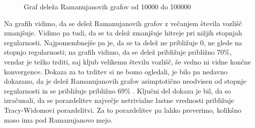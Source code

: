 \begin{figure}[H]
    \centering
    \caption{Graf deleža Ramanujanovih grafov od 10000 do 100000}
\end{figure}
Na grafih vidimo, da se delež Ramanujanovih grafov z večanjem števila vozlišč zmanjšuje. Vidimo pa tudi, da se ta delež zmanjšuje hitreje pri nižjih stopnjah regularnosti. Najpomembnejše pa je, da se ta delež ne približuje \(0\), ne glede na stopnjo regularnosti; na grafih vidimo, da se delež približuje približno \(70\%\), vendar je težko trditi, saj kljub velikemu številu vozlišč, še vedno ni vidne končne konvergence. Dokaza za to trditev si ne bomo ogledali, je bilo pa nedavno dokazano, da je delež Ramanujanovih grafov asimptotično neodvisen od stopnje regularnosti in se približuje približno \(69\%\) \cite{huang2024ramanujanpropertyedgeuniversality}. Ključni del dokaza je bil, da so izračunali, da se porazdelitev največje netrivialne lastne vrednosti približuje Tracy-Widomovi porazdelitvi. Za to porazdelitev pa lahko preverimo, kolikšno maso ima pod Ramanujanovo mejo.

